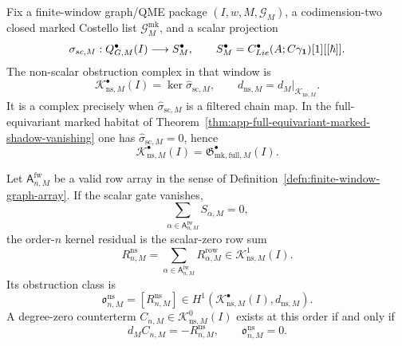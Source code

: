 \begin{defn}
\label{def:app-nonscalar-kernel-row-complex}
  Fix a finite-window graph/QME package
  \((I,w,M,\mathcal G_M)\), a codimension-two closed marked Costello list
  \(\mathcal G^{\mathrm{mk}}_M\), and a scalar projection
  \[
    \sigma_{sc,M}:
    Q^\bullet_{G,M}(I)
      \longrightarrow
    S^\bullet_M,\qquad
    S^\bullet_M=
    C^\bullet_{Lie}(A;C\gamma_{\mathbf 1})[1][[\hbar]] .
  \]
  The non-scalar obstruction complex in that window is
  \[
    \mathcal K^\bullet_{\mathrm{ns},M}(I)
      =
    \ker\widehat\sigma_{\mathrm{sc},M},
    \qquad
    d_{\mathrm{ns},M}=d_M|_{\mathcal K_{\mathrm{ns},M}} .
  \]
  It is a complex precisely when \(\widehat\sigma_{\mathrm{sc},M}\) is a
  filtered chain map.  In the full-equivariant marked habitat of
  Theorem~\ref{thm:app-full-equivariant-marked-shadow-vanishing} one has
  \(\widehat\sigma_{\mathrm{sc},M}=0\), hence
  \[
    \mathcal K^\bullet_{\mathrm{ns},M}(I)
      =
    \mathfrak G^\bullet_{\mathrm{mk,full},M}(I).
  \]

  Let \(\mathsf A^{\mathrm{fw}}_{n,M}\) be a valid row array in the sense
  of Definition~\ref{defn:finite-window-graph-array}.  If the scalar gate
  vanishes,
  \[
    \sum_{\alpha\in\mathsf A^{\mathrm{fw}}_{n,M}}S_{\alpha,M}=0,
  \]
  the order-\(n\) kernel residual is the scalar-zero row sum
  \[
    R^{\mathrm{ns}}_{n,M}
      =
    \sum_{\alpha\in\mathsf A^{\mathrm{fw}}_{n,M}}
      R^{\mathrm{row}}_{\alpha,M}
      \in\mathcal K^1_{\mathrm{ns},M}(I).
  \]
  Its obstruction class is
  \[
    \mathfrak o^{\mathrm{ns}}_{n,M}
      =
    [R^{\mathrm{ns}}_{n,M}]
      \in
    H^1\!\left(
      \mathcal K^\bullet_{\mathrm{ns},M}(I),d_{\mathrm{ns},M}
    \right).
  \]
  A degree-zero counterterm
  \(C_{n,M}\in\mathcal K^0_{\mathrm{ns},M}(I)\) exists at this order if
  and only if
  \[
    d_M C_{n,M}=-R^{\mathrm{ns}}_{n,M},
    \qquad
    \mathfrak o^{\mathrm{ns}}_{n,M}=0.
  \]
\end{defn}

